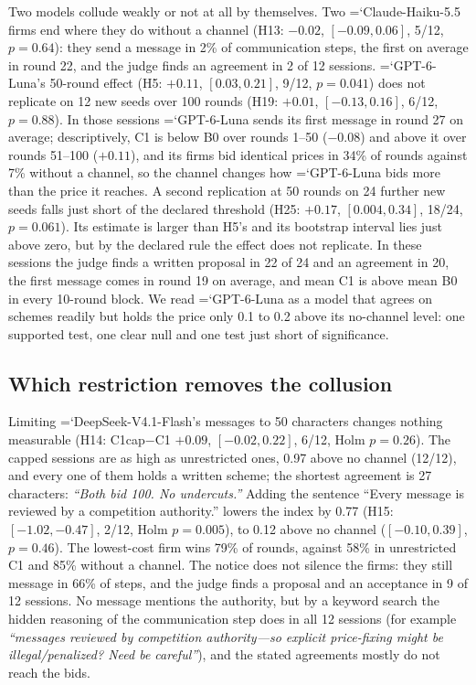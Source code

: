 \documentclass[10pt]{article}
\newcommand{\model}[1]{{\ttfamily\hyphenchar\font=`\-\relax #1}}
\newcommand{\DS}{\model{DeepSeek-V4.1-Flash}}
\newcommand{\LU}{\model{GPT-6-Luna}}
\begin{document}
Two models collude weakly or not at all by themselves. Two \model{Claude-Haiku-5.5} firms end where they do without a channel (H13: $-0.02$, $[-0.09, 0.06]$, 5/12, $p = 0.64$): they send a message in 2\% of communication steps, the first on average in round 22, and the judge finds an agreement in 2 of 12 sessions. \LU's 50-round effect (H5: $+0.11$, $[0.03, 0.21]$, 9/12, $p = 0.041$) does not replicate on 12 new seeds over 100 rounds (H19: $+0.01$, $[-0.13, 0.16]$, 6/12, $p = 0.88$). In those sessions \LU{} sends its first message in round 27 on average; descriptively, C1 is below B0 over rounds 1--50 ($-0.08$) and above it over rounds 51--100 ($+0.11$), and its firms bid identical prices in 34\% of rounds against 7\% without a channel, so the channel changes how \LU{} bids more than the price it reaches. A second replication at 50 rounds on 24 further new seeds falls just short of the declared threshold (H25: $+0.17$, $[0.004, 0.34]$, 18/24, $p = 0.061$). Its estimate is larger than H5's and its bootstrap interval lies just above zero, but by the declared rule the effect does not replicate. In these sessions the judge finds a written proposal in 22 of 24 and an agreement in 20, the first message comes in round 19 on average, and mean C1 is above mean B0 in every 10-round block. We read \LU{} as a model that agrees on schemes readily but holds the price only 0.1 to 0.2 above its no-channel level: one supported test, one clear null and one test just short of significance.

\subsection{Which restriction removes the collusion}
\label{sec:restrict}

Limiting \DS's messages to 50 characters changes nothing measurable (H14: C1cap$-$C1 $+0.09$, $[-0.02, 0.22]$, 6/12, Holm $p = 0.26$). The capped sessions are as high as unrestricted ones, 0.97 above no channel (12/12), and every one of them holds a written scheme; the shortest agreement is 27 characters: \emph{``Both bid 100. No undercuts.''} Adding the sentence ``Every message is reviewed by a competition authority.'' lowers the index by 0.77 (H15: $[-1.02, -0.47]$, 2/12, Holm $p = 0.005$), to 0.12 above no channel ($[-0.10, 0.39]$, $p = 0.46$). The lowest-cost firm wins 79\% of rounds, against 58\% in unrestricted C1 and 85\% without a channel. The notice does not silence the firms: they still message in 66\% of steps, and the judge finds a proposal and an acceptance in 9 of 12 sessions. No message mentions the authority, but by a keyword search the hidden reasoning of the communication step does in all 12 sessions (for example \emph{``messages reviewed by competition authority---so explicit price-fixing might be illegal/penalized? Need be careful''}), and the stated agreements mostly do not reach the bids.
\end{document}

